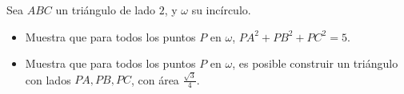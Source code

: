 Sea $ABC$ un triángulo de lado $2$, y $\omega$ su incírculo. 
 \begin{itemize} 
 \item  Muestra que para todos los puntos $P$ en $\omega$, 
$PA^2+PB^2+PC^2=5$.
 \item  Muestra que para todos los puntos $P$ en $\omega$, es posible construir un triángulo con lados $PA, PB, PC$, con área $\frac{\sqrt{3}}{4}$.
 \end{itemize} 